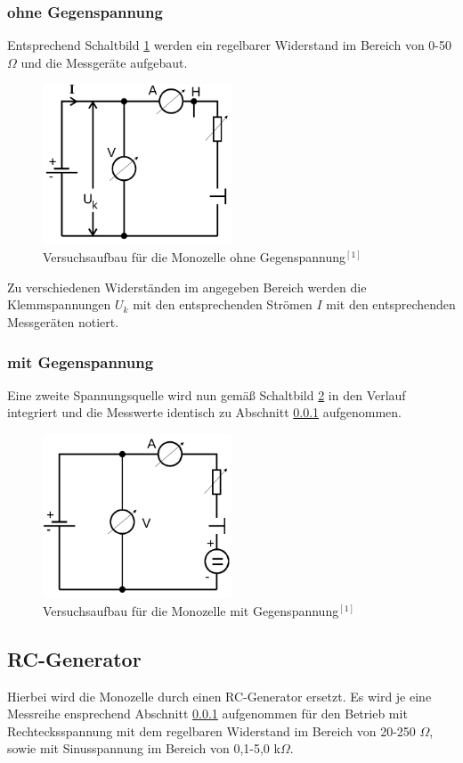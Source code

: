 \subsubsection{ohne Gegenspannung}
\label{sec_ogegen}
Entsprechend Schaltbild \ref{pic_ogegenspannung} werden ein regelbarer Widerstand im Bereich von 0-50 $\Omega$ und die Messgeräte aufgebaut.
\begin{figure}[H]
 \includegraphics[width=0.5\textwidth]{pics/ohne.png}
 \caption{Versuchsaufbau für die Monozelle ohne Gegenspannung$^{[1]}$}
 \label{pic_ogegenspannung}
\end{figure}
Zu verschiedenen Widerständen im angegeben Bereich werden die Klemmspannungen $U_k$ mit den entsprechenden Strömen $I$ mit den entsprechenden
Messgeräten notiert.
\subsubsection{mit Gegenspannung}
Eine zweite Spannungsquelle wird nun gemäß Schaltbild \ref{pic_mgegenspannung} in den Verlauf integriert und die Messwerte identisch zu Abschnitt
\ref{sec_ogegen} aufgenommen.
\begin{figure}[H]
 \includegraphics[width=0.5\textwidth]{pics/mit.png}
 \caption{Versuchsaufbau für die Monozelle mit Gegenspannung$^{[1]}$}
 \label{pic_mgegenspannung}
\end{figure}
\newpage
\subsection{RC-Generator}
Hierbei wird die Monozelle durch einen RC-Generator ersetzt. Es wird je eine Messreihe ensprechend Abschnitt \ref{sec_ogegen} aufgenommen
für den Betrieb mit Rechtecksspannung mit dem regelbaren Widerstand im Bereich von 20-250 $\Omega$, sowie mit Sinusspannung im Bereich von
0,1-5,0 k$\Omega$.
